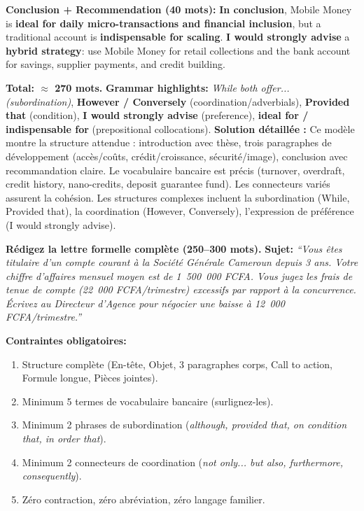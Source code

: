 \documentclass[11pt]{article}
\begin{document}
\begin{exoresolu}
\textbf{Conclusion + Recommendation (40 mots):}
\textbf{In conclusion}, Mobile Money is \textbf{ideal for daily micro-transactions and financial inclusion}, but a traditional account is \textbf{indispensable for scaling}. \textbf{I would strongly advise} a \textbf{hybrid strategy}: use Mobile Money for retail collections and the bank account for savings, supplier payments, and credit building.

\textbf{Total: $\approx$ 270 mots.}
\textbf{Grammar highlights:} \textit{While both offer... (subordination)}, \textbf{However / Conversely} (coordination/adverbials), \textbf{Provided that} (condition), \textbf{I would strongly advise} (preference), \textbf{ideal for / indispensable for} (prepositional collocations).
\tcblower
\textbf{Solution détaillée :} Ce modèle montre la structure attendue : introduction avec thèse, trois paragraphes de développement (accès/coûts, crédit/croissance, sécurité/image), conclusion avec recommandation claire. Le vocabulaire bancaire est précis (turnover, overdraft, credit history, nano-credits, deposit guarantee fund). Les connecteurs variés assurent la cohésion. Les structures complexes incluent la subordination (While, Provided that), la coordination (However, Conversely), l'expression de préférence (I would strongly advise).
\end{exoresolu}

\begin{exercice}
\textbf{Rédigez la lettre formelle complète (250--300 mots).}
\textbf{Sujet:} \textit{``Vous êtes titulaire d'un compte courant à la Société Générale Cameroun depuis 3 ans. Votre chiffre d'affaires mensuel moyen est de 1~500~000 FCFA. Vous jugez les frais de tenue de compte (22~000 FCFA/trimestre) excessifs par rapport à la concurrence. Écrivez au Directeur d'Agence pour négocier une baisse à 12~000 FCFA/trimestre.''}

\textbf{Contraintes obligatoires:}
\begin{enumerate}
    \item Structure complète (En-tête, Objet, 3 paragraphes corps, Call to action, Formule longue, Pièces jointes).
    \item Minimum 5 termes de vocabulaire bancaire (surlignez-les).
    \item Minimum 2 phrases de subordination (\textit{although, provided that, on condition that, in order that}).
    \item Minimum 2 connecteurs de coordination (\textit{not only... but also, furthermore, consequently}).
    \item Zéro contraction, zéro abréviation, zéro langage familier.
\end{enumerate}
\end{exercice}
\end{document}
